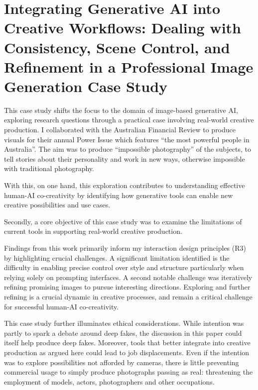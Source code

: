 \chapter[Human-AI Co-Creativity in Visual Production]{Integrating Generative AI into Creative Workflows: Dealing with Consistency, Scene Control, and Refinement in a Professional Image Generation Case Study
} \label{c:tc6} 

This case study shifts the focus to the domain of image-based generative AI, exploring research questions through a practical case involving real-world creative production. I collaborated with the Australian Financial Review to produce visuals for their annual Power Issue which features “the most powerful people in Australia”. The aim was to produce “impossible photography” of the subjects, to tell stories about their personality and work in new ways, otherwise impossible with traditional photography. 

With this, on one hand, this exploration contributes to understanding effective human-AI co-creativity by identifying how generative tools can enable new creative possibilities and use cases.

Secondly, a core objective of this case study was to examine the limitations of current tools in supporting real-world creative production. 

Findings from this work primarily inform my interaction design principles (R3) by highlighting crucial challenges. A significant limitation identified is the difficulty in enabling precise control over style and structure particularly when relying solely on prompting interfaces. A second notable challenge was iteratively refining promising images to pursue interesting directions. Exploring and further refining is a crucial dynamic in creative processes, and remain a critical challenge for successful human-AI co-creativity. 

This case study further illuminates ethical considerations. While intention was partly to spark a debate around deep fakes, the discussion in this paper could itself help produce deep fakes. Moreover, tools that better integrate into creative production as argued here could lead to job displacements. Even if the intention was to explore possibilities not afforded by cameras, there is little preventing commercial usage to simply produce photographs passing as real: threatening the employment of models, actors, photographers and other occupations. 




